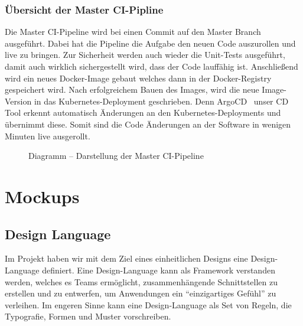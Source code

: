 \subsubsection{Übersicht der Master \ac{CI}-Pipline}
Die Master \ac{CI}-Pipeline wird bei einen Commit auf den Master Branch ausgeführt. Dabei hat die Pipeline die Aufgabe den neuen Code auszurollen und live zu bringen.
Zur Sicherheit werden auch wieder die Unit-Tests ausgeführt, damit auch wirklich sichergestellt wird, dass der Code lauffähig ist. Anschließend wird ein neues Docker-Image gebaut
welches dann in der Docker-Registry gespeichert wird. Nach erfolgreichem Bauen des Images, wird die neue Image-Version in das Kubernetes-Deployment geschrieben. Denn ArgoCD~\parencite{web/argocd} unser \ac{CD} Tool
erkennt automatisch Änderungen an den Kubernetes-Deployments und übernimmt diese. Somit sind die Code Änderungen an der Software in wenigen Minuten live ausgerollt.
\begin{figure}[!htbp]
    \centering    
    \usetikzlibrary{positioning}
\caption{Diagramm – Darstellung der Master \ac{CI}-Pipeline}
\end{figure}

\section{Mockups}
\subsection{Design Language}
Im Projekt haben wir mit dem Ziel eines einheitlichen Designs eine Design-Language definiert.
Eine Design-Language kann als Framework verstanden werden, welches es Teams ermöglicht, 
zusammenhängende Schnittstellen zu erstellen und zu entwerfen, um Anwendungen ein \enquote{einzigartiges Gefühl} zu verleihen.
Im engeren Sinne kann eine Design-Language als Set von Regeln, die Typografie, Formen und Muster vorschreiben.

